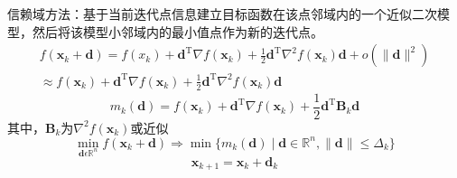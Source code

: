 \begin{note}
    信赖域方法：基于当前迭代点信息建立目标函数在该点邻域内的一个近似二次模型，然后将该模型小邻域内的最小值点作为新的迭代点。
    \[
        \begin{gathered}
            f(\boldsymbol{x}_{k}+\boldsymbol{d}) =f(x_{k})+\boldsymbol{d}^{\mathrm{T}}\nabla f(\boldsymbol{x}_{k})+\frac{1}{2}\boldsymbol{d}^{\mathrm{T}}\nabla^{2}f(\boldsymbol{x}_{k})\boldsymbol{d}+o(\|\boldsymbol{d}\|^{2}) \\
            \approx f(\boldsymbol{x}_{k})+\boldsymbol{d}^{\mathrm{T}}\nabla f(\boldsymbol{x}_{k})+\frac12\boldsymbol{d}^{\mathrm{T}}\nabla^{2}f(\boldsymbol{x}_{k})\boldsymbol{d} 
        \end{gathered}
    \]
    \[
        m_k(\boldsymbol{d})=f(\boldsymbol{x}_k)+\boldsymbol{d}^\mathrm{T}\nabla f(\boldsymbol{x}_k)+\frac{1}{2}\boldsymbol{d}^\mathrm{T}\boldsymbol{B}_k\boldsymbol{d}
    \]
    其中，$\boldsymbol{B}_k$为$\nabla^{2}f(\boldsymbol{x}_{k})$或近似
    \[
        \min_{\boldsymbol{d}\epsilon\mathbb{R}^n}f(\boldsymbol{x}_k+\boldsymbol{d})\Rightarrow\min\{m_k(\boldsymbol{d})\mid\boldsymbol{d}\in\mathbb{R}^n,\lVert\boldsymbol{d}\rVert\leqslant\Delta_k\}
    \]
    \[
        \boldsymbol{x}_{k+1} = \boldsymbol{x}_k+\boldsymbol{d}_k
    \]
\end{note}
